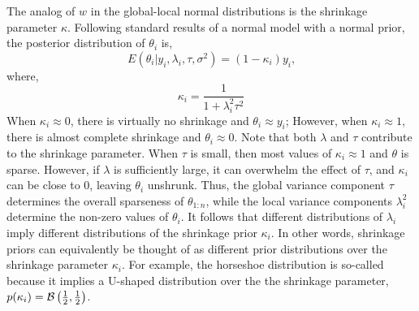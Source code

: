 \documentclass{article}
\begin{document}
The analog of $w$ in the global-local normal distributions is the shrinkage parameter $\kappa$.
Following standard results of a normal model with a normal prior, the posterior distribution of $\theta_{i}$ is,
\begin{equation}
  \label{eq:11}
  E ( \theta_{i} | y_{i}, \lambda_{i}, \tau, \sigma^{2} )  = (1 - \kappa_{i}) y_{i} \text{,}
\end{equation}
where, 
\begin{equation}
  \label{eq:19}
  \kappa_{i} = \frac{1}{1 + \lambda^{2}_{i} \tau^{2}}
\end{equation}
When $\kappa_{i} \approx 0$, there is virtually no shrinkage and $\theta_{i} \approx y_{i}$;
However, when $\kappa_{i} \approx 1$, there is almost complete shrinkage and $\theta_{i} \approx 0$.
Note that both $\lambda$ and $\tau$ contribute to the shrinkage parameter.
When $\tau$ is small, then most values of $\kappa_{i} \approx 1$ and $\theta$ is sparse.
However, if $\lambda$ is sufficiently large, it can overwhelm the effect of $\tau$, and $\kappa_{i}$ can be close to 0, leaving $\theta_{i}$ unshrunk.
Thus, the global variance component $\tau$ determines the overall sparseness of $\theta_{1:n}$, while the local variance components $\lambda_{i}^{2}$ determine the non-zero values of $\theta_{i}$.
It follows that different distributions of $\lambda_{i}$ imply different distributions of the shrinkage prior $\kappa_{i}$.
In other words, shrinkage priors can equivalently be thought of as different prior distributions over the shrinkage parameter $\kappa_{i}$.
For example, the horseshoe distribution is so-called because it implies a U-shaped distribution over the the shrinkage parameter, $p(\kappa_{i}) = \mathcal{B}\left(\frac{1}{2}, \frac{1}{2}\right)$.
\end{document}
